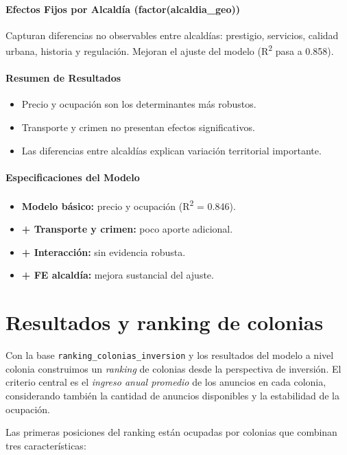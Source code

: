 \documentclass[12pt]{article}
\begin{document}
\paragraph{Efectos Fijos por Alcaldía (factor(alcaldia\_geo))}
Capturan diferencias no observables entre alcaldías: prestigio, servicios, calidad urbana, historia y regulación. Mejoran el ajuste del modelo (R\textsuperscript{2} pasa a 0.858).

\paragraph{Resumen de Resultados}
\begin{itemize}
    \item Precio y ocupación son los determinantes más robustos.
    \item Transporte y crimen no presentan efectos significativos.
    \item Las diferencias entre alcaldías explican variación territorial importante.
\end{itemize}

\paragraph{Especificaciones del Modelo}
\begin{itemize}
    \item \textbf{Modelo básico:} precio y ocupación (R\textsuperscript{2} = 0.846).
    \item \textbf{+ Transporte y crimen:} poco aporte adicional.
    \item \textbf{+ Interacción:} sin evidencia robusta.
    \item \textbf{+ FE alcaldía:} mejora sustancial del ajuste.
\end{itemize}

\section{Resultados y ranking de colonias}

Con la base \texttt{ranking\_colonias\_inversion} y los resultados del modelo a nivel colonia construimos un \textit{ranking} de colonias desde la perspectiva de inversión. El criterio central es el \emph{ingreso anual promedio} de los anuncios en cada colonia, considerando también la cantidad de anuncios disponibles y la estabilidad de la ocupación.

Las primeras posiciones del ranking están ocupadas por colonias que combinan tres características:
\end{document}

